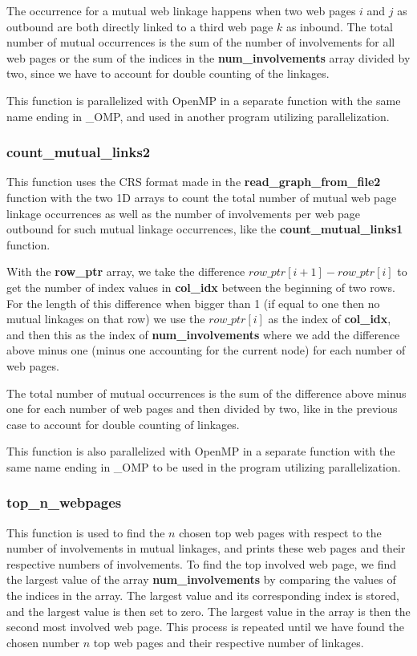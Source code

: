 \documentclass[12pt,a4paper,english]{article}
\begin{document}
The occurrence for a mutual web linkage happens when two web pages $i$ and $j$ as outbound are both directly linked to a third web page $k$ as inbound. The total number of mutual occurrences is the sum of the number of involvements for all web pages or the sum of the indices in the \textbf{num\_involvements} array divided by two, since we have to account for double counting of the linkages.

This function is parallelized with OpenMP in a separate function with the same name ending in \_OMP, and used in another program utilizing parallelization.

\subsubsection{count\_mutual\_links2}
This function uses the CRS format made in the \textbf{read\_graph\_from\_file2} function with the two 1D arrays to count the total number of mutual web page linkage occurrences as well as the number of involvements per web page outbound for such mutual linkage occurrences, like the \textbf{count\_mutual\_links1} function.

With the \textbf{row\_ptr} array, we take the difference $row\_ptr[i+1]-row\_ptr[i]$ to get the number of index values in \textbf{col\_idx} between the beginning of two rows. For the length of this difference when bigger than 1 (if equal to one then no mutual linkages on that row) we use the $row\_ptr[i]$ as the index of \textbf{col\_idx}, and then this as the index of \textbf{num\_involvements} where we add the difference above minus one (minus one accounting for the current node) for each number of web pages.

The total number of mutual occurrences is the sum of the difference above minus one for each number of web pages and then divided by two, like in the previous case to account for double counting of linkages.

This function is also parallelized with OpenMP in a separate function with the same name ending in \_OMP to be used in the program utilizing parallelization.

\subsubsection{top\_n\_webpages}
This function is used to find the $n$ chosen top web pages with respect to the number of involvements in mutual linkages, and prints these web pages and their respective numbers of involvements. To find the top involved web page, we find the largest value of the array \textbf{num\_involvements} by comparing the values of the indices in the array. The largest value and its corresponding index is stored, and the largest value is then set to zero. The largest value in the array is then the second most involved web page. This process is repeated until we have found the chosen number $n$ top web pages and their respective number of linkages.
\end{document}
